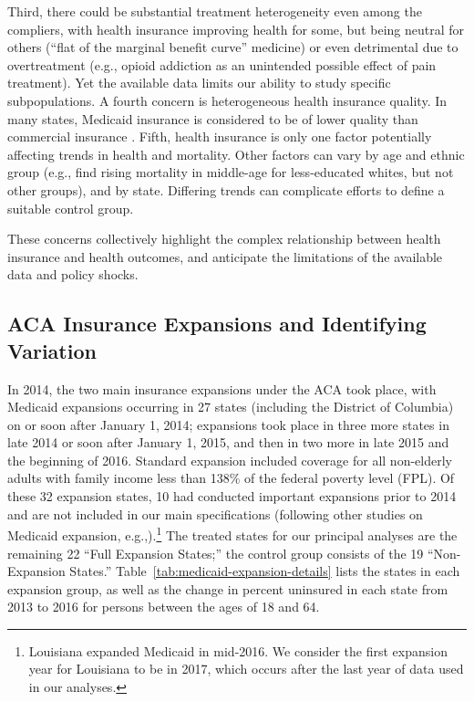 \documentclass[12pt]{article}%
\begin{document}
Third, there could be substantial treatment heterogeneity even among the compliers, with health insurance improving health for some, but being neutral for others (``flat of the marginal benefit curve'' medicine) or even detrimental due to overtreatment (e.g., opioid addiction as an unintended possible effect of pain treatment). 
Yet the available data limits our ability to study specific subpopulations.
A fourth concern is heterogeneous health insurance quality.  
In many states, Medicaid insurance is considered to be of lower quality than commercial insurance \citep{polskyAppointmentAvailabilityIncreases2015}.  
Fifth, health insurance is only one factor potentially affecting trends in health and mortality.  
Other factors can vary by age and ethnic group (e.g., \citet{Case15078} find rising mortality in middle-age for less-educated whites, but not other groups), and by state.  
Differing trends can complicate efforts to define a suitable control group. 


These concerns collectively highlight the complex relationship between health insurance and health outcomes, and anticipate the limitations of the available data and policy shocks.

\subsection{ACA Insurance Expansions and Identifying Variation}

In 2014, the two main insurance expansions under the ACA took place, with Medicaid expansions occurring in 27 states (including the District of Columbia) on or soon after January 1, 2014; expansions took place in three more states in late 2014 or soon after January 1, 2015, and then in two more in late 2015 and the beginning of 2016. 
Standard expansion included coverage for all non-elderly adults with family income less than 138\% of the federal poverty level (FPL).
Of these 32 expansion states, 10 had conducted important expansions prior to 2014 and are not included in our main specifications (following other studies on Medicaid expansion, e.g.,\citet{wherryEarlyCoverageAccess2016}).\footnote{Louisiana expanded Medicaid in mid-2016. We consider the first expansion year for Louisiana to be in 2017, which occurs after the last year of data used in our analyses.}
The treated states for our principal analyses are the remaining 22 ``Full Expansion States;'' the control group consists of the 19 ``Non-Expansion States.''  
Table~\ref{tab:medicaid-expansion-details} lists the states in each expansion group, as well as the change in percent uninsured in each state from 2013 to 2016 for persons between the ages of 18 and 64.
\end{document}
